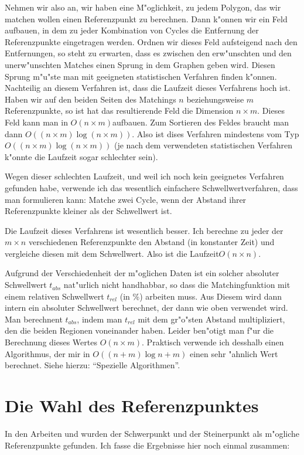 \documentclass[a4paper,10pt,twoside]{scrreprt}
\begin{document}
Nehmen wir also an, wir haben eine M"oglichkeit, zu jedem Polygon, das wir matchen wollen einen Referenzpunkt zu berechnen. Dann k"onnen wir ein Feld aufbauen, in dem zu jeder Kombination von Cycles die Entfernung der Referenzpunkte eingetragen werden. Ordnen wir dieses Feld aufsteigend nach den Entfernungen, so steht zu erwarten, dass es zwischen den erw"unschten und den unerw"unschten Matches einen Sprung in dem Graphen geben wird. Diesen Sprung m"u"ste man mit geeigneten statistischen Verfahren finden k"onnen. Nachteilig an diesem Verfahren ist, dass die Laufzeit dieses Verfahrens hoch ist. Haben wir auf den beiden Seiten des Matchings $n$ beziehungsweise $m$ Referenzpunkte, so ist hat das resultierende Feld die Dimension $n\times m$. Dieses Feld kann man in $O(n\times m)$aufbauen. Zum Sortieren des Feldes braucht man dann $O((n\times m)\log(n\times m))$. Also ist dises Verfahren mindestens vom Typ $O((n\times m)\log(n\times m))$ (je nach dem verwendeten statistischen Verfahren k"onnte die Laufzeit sogar schlechter sein).

Wegen dieser schlechten Laufzeit, und weil ich noch kein geeignetes Verfahren gefunden habe, verwende ich das wesentlich einfachere Schwellwertverfahren, dass man formulieren kann: Matche zwei Cycle, wenn der Abstand ihrer Referenzpunkte kleiner als der Schwellwert ist. 

Die Laufzeit dieses Verfahrens ist wesentlich besser. Ich berechne zu jeder der $m\times n$ verschiedenen  Referenzpunkte den Abstand (in konstanter Zeit) und vergleiche diesen mit dem Schwellwert. Also ist die Laufzeit$O(n\times n)$.

Aufgrund der Verschiedenheit der m"oglichen Daten ist ein solcher absoluter Schwellwert $t_{abs}$ nat"urlich nicht handhabbar, so dass die Matchingfunktion mit einem relativen Schwellwert $t_{rel}$ (in \%) arbeiten muss. Aus Diesem wird dann intern ein absoluter Schwellwert berechnet, der dann wie oben verwendet wird. Man berechnent $t_{abs}$, indem man $t_{rel}$ mit dem gr"o"sten Abstand multipliziert, den die beiden Regionen voneinander haben. Leider ben"otigt man f"ur die Berechnung dieses Wertes $O(n\times m)$. Praktisch verwende ich desshalb einen Algorithmus, der mir in $O((n+m)\log{n+m})$ einen sehr "ahnlich Wert berechnet. Siehe hierzu: "`Spezielle Algorithmen"'.

\section{Die Wahl des Referenzpunktes}
In den Arbeiten \cite{AAR} und  \cite{AFRW} wurden der Schwerpunkt und der Steinerpunkt als m"ogliche Referenzpunkte gefunden. Ich fasse die Ergebnisse hier noch einmal zusammen:
\end{document}

